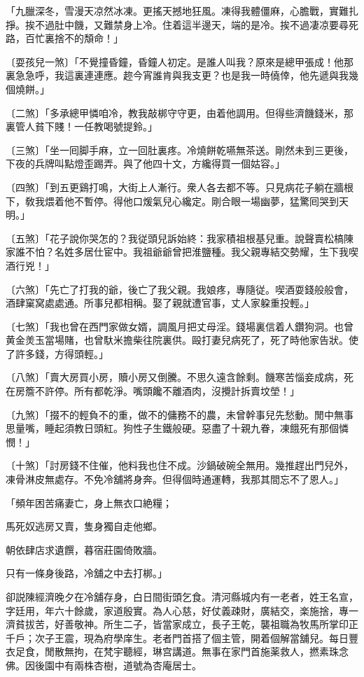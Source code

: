 \begin{myquote}
「九臘深冬，雪漫天凉然冰凍。更搖天撼地狂風。凍得我體僵麻，心膽戰，實難扎掙。挨不過肚中饑，又難禁身上冷。住着這半邊天，端的是冷。挨不過凄凉要尋死路，百忙裏捨不的頽命！」

{\markfont〔耍孩兒一煞〕}「不覺撞昏鐘，昏鐘人初定。是誰人叫我？原來是總甲張成！他那裏急急呼，我這裏連連應。趂今宵誰肯與我支更？也是我一時僥倖，他先遞與我幾個燒餅。」

{\markfont〔二煞〕}「多承總甲憐咱冷，教我敲梆守守更，由着他調用。但得些濟饑錢米，那裏管人貧下賤！一任教喝號提鈴。」

{\markfont〔三煞〕}「坐一囘脚手麻，立一回肚裏疼。冷燒餅乾嚥無茶送。剛然未到三更後，下夜的兵牌叫點燈歪踢弄。與了他四十文，方纔得買一個姑容。」

{\markfont〔四煞〕}「到五更鷄打鳴，大街上人漸行。衆人各去都不等。只見病花子躺在牆根下，敎我煨着他不暫停。得他口煖氣兒心纔定。剛合眼一場幽夢，猛驚囘哭到天明。」

{\markfont〔五煞〕}「花子說你哭怎的？我従頭兒訴始終：我家積祖根基兒重。說聲賣松槁陳家誰不怕？名姓多居仕宦中。我祖爺爺曾把淮鹽種。我父親專結交勢耀，生下我喫酒行兇！」

{\markfont〔六煞〕}「先亡了打我的爺，後亡了我父親。我娘疼，專隨従。喫酒耍錢般般會，酒肆窠窝處處通。所事兒都相稱。娶了親就遭官事，丈人家躱重投輕。」

{\markfont〔七煞〕}「我也曾在西門家做女婿，調風月把丈母淫。錢場裏信着人鑽狗洞。也曾黄金羙玉當場賭，也曾馱米擔柴往院裏供。毆打妻兒病死了，死了時他家告狀。使了許多錢，方得頭輕。」

{\markfont〔八煞〕}「賣大房買小房，贖小房又倒騰。不思久遠含餘剩。饑寒苦惱妾成病，死在房簷不許停。所有都乾淨。嘴頭饞不離酒肉，沒攪計拆賣坟塋！」

{\markfont〔九煞〕}「掇不的輕負不的重，做不的傭務不的農，未曾幹事兒先愁動。閒中無事思量嘴，睡起須教日頭紅。狗性子生鐵般硬。惡盡了十親九眷，凍餓死有那個憐憫！」

{\markfont〔十煞〕}「討房錢不住催，他料我也住不成。沙鍋破碗全無用。幾推趕出門兒外，凍骨淋皮無處存。不免冷舖將身奔。但得個時通運轉，我那其間忘不了恩人。」

「頻年困苦痛妻亡，身上無衣口絶糧；

馬死奴逃房又賣，隻身獨自走他鄉。

朝依肆店求遺饌，暮宿莊園倚敗牆。

只有一條身後路，冷舖之中去打梆。」
\end{myquote}

卻説陳經濟晚夕在冷舖存身，白日間街頭乞食。清河縣城内有一老者，姓王名宣，字廷用，年六十餘歲，家道殷實。為人心慈，好仗義疎財，廣結交，楽施捨，專一濟貧拔苦，好善敬神。所生二子，皆當家成立，長子王乾，襲祖職為牧馬所掌印正千戶；次子王震，現為府學庠生。老者門首搭了個主管，開着個解當舖兒。每日豐衣足食，閒散無拘，在梵宇聽經，琳宫講道。無事在家門首施薬救人，撚素珠念佛。因後園中有兩株杏樹，道號為杏庵居士。

